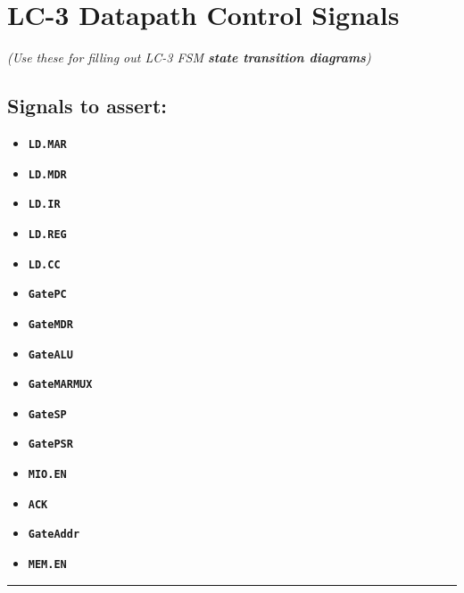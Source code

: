 \newpage
\section*{LC-3 Datapath Control Signals}
\begin{center}
    \large
    \textit{(Use these for filling out LC-3 FSM \textbf{state transition diagrams})}
\end{center}
\raggedright
\begin{minipage}{0.25\linewidth}
\subsection*{Signals to assert:}
\ifio
    \large
\else
    \Large
\fi
\begin{itemize}
    \item \textbf{\texttt{LD.MAR}}
    \item \textbf{\texttt{LD.MDR}}
    \item \textbf{\texttt{LD.IR}}
    \item \textbf{\texttt{LD.REG}}
    \item \textbf{\texttt{LD.CC}}
    \item \textbf{\texttt{GatePC}}
    \item \textbf{\texttt{GateMDR}}
    \item \textbf{\texttt{GateALU}}
    \ifio
        \item \textbf{\texttt{GateMARMUX}}
        \item \textbf{\texttt{GateSP}}
        \item \textbf{\texttt{GatePSR}}
        \item \textbf{\texttt{MIO.EN}}
        \item \textbf{\texttt{ACK}}
    \else
        \item \textbf{\texttt{GateAddr}}
        \item \textbf{\texttt{MEM.EN}}
    \fi
\end{itemize}
\end{minipage}
\rule[-10em]{0.4pt}{20em}
\hspace{1em}
